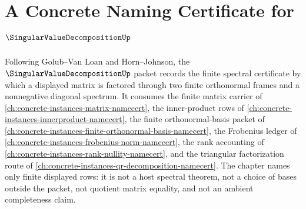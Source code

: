 \chapter{A Concrete Naming Certificate for $\SingularValueDecompositionUp$}
\label{ch:concrete-instances-singular-value-decomposition-namecert}

Following Golub--Van Loan and Horn--Johnson, the $\SingularValueDecompositionUp$ packet records the finite spectral certificate by which a displayed matrix is factored through two finite orthonormal frames and a nonnegative diagonal spectrum. It consumes the finite matrix carrier of \autoref{ch:concrete-instances-matrix-namecert}, the inner-product rows of \autoref{ch:concrete-instances-innerproduct-namecert}, the finite orthonormal-basis packet of \autoref{ch:concrete-instances-finite-orthonormal-basis-namecert}, the Frobenius ledger of \autoref{ch:concrete-instances-frobenius-norm-namecert}, the rank accounting of \autoref{ch:concrete-instances-rank-nullity-namecert}, and the triangular factorization route of \autoref{ch:concrete-instances-qr-decomposition-namecert}. The chapter names only finite displayed rows: it is not a host spectral theorem, not a choice of bases outside the packet, not quotient matrix equality, and not an ambient completeness claim.

